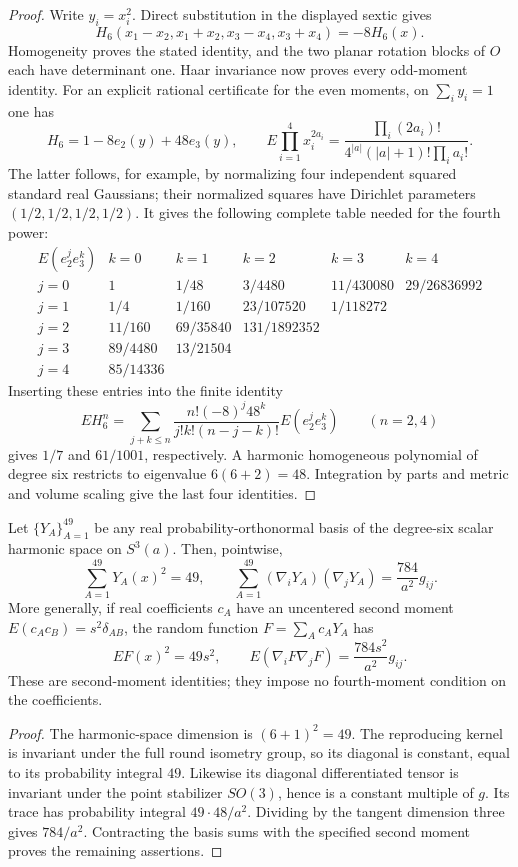 \documentclass[11pt]{article}
\begin{document}
\begin{proof}
Write \(y_i=x_i^2\). Direct substitution in the displayed sextic gives
\[
 H_6(x_1-x_2,x_1+x_2,x_3-x_4,x_3+x_4)=-8H_6(x).
\]
Homogeneity proves the stated identity, and the two planar rotation
blocks of \(O\) each have determinant one. Haar invariance now proves
every odd-moment identity. For an explicit rational certificate for the
even moments, on \(\sum_i y_i=1\) one has
\[
 H_6=1-8e_2(y)+48e_3(y),\qquad
 E\prod_{i=1}^4x_i^{2a_i}
 =\frac{\prod_i(2a_i)!}
 {4^{|a|}(|a|+1)!\prod_i a_i!}.
\]
The latter follows, for example, by normalizing four independent squared
standard real Gaussians; their normalized squares have Dirichlet
parameters \((1/2,1/2,1/2,1/2)\). It gives the following complete table
needed for the fourth power:
\[
\begin{array}{c|ccccc}
 E(e_2^j e_3^k)&k=0&k=1&k=2&k=3&k=4\\\hline
 j=0&1&1/48&3/4480&11/430080&29/26836992\\
 j=1&1/4&1/160&23/107520&1/118272&\\
 j=2&11/160&69/35840&131/1892352&&\\
 j=3&89/4480&13/21504&&&\\
 j=4&85/14336&&&&
\end{array}
\]
Inserting these entries into the finite identity
\[
 E H_6^n=
 \sum_{j+k\leq n}\frac{n!(-8)^j48^k}{j!k!(n-j-k)!}
                  E(e_2^j e_3^k)
 \qquad(n=2,4)
\]
gives \(1/7\) and \(61/1001\), respectively. A harmonic homogeneous
polynomial of degree six restricts to eigenvalue \(6(6+2)=48\).
Integration by parts and metric and volume scaling give the last four
identities.
\end{proof}

\begin{proposition}
\label{p1:prop:v215-degree-six-kernels}
Let \(\{Y_A\}_{A=1}^{49}\) be any real probability-orthonormal basis of
the degree-six scalar harmonic space on \(S^3(a)\). Then, pointwise,
\[
 \sum_{A=1}^{49}Y_A(x)^2=49,\qquad
 \sum_{A=1}^{49}(\nabla_iY_A)(\nabla_jY_A)
                 =\frac{784}{a^2}g_{ij}.
\]
More generally, if real coefficients \(c_A\) have an uncentered second
moment \(E(c_Ac_B)=s^2\delta_{AB}\), the random function
\(F=\sum_Ac_AY_A\) has
\[
 E F(x)^2=49s^2,\qquad
 E(\nabla_iF\nabla_jF)=\frac{784s^2}{a^2}g_{ij}.
\]
These are second-moment identities; they impose no fourth-moment
condition on the coefficients.
\end{proposition}
\begin{proof}
The harmonic-space dimension is \((6+1)^2=49\). The reproducing kernel
is invariant under the full round isometry group, so its diagonal is
constant, equal to its probability integral \(49\). Likewise its
diagonal differentiated tensor is invariant under the point stabilizer
\(SO(3)\), hence is a constant multiple of \(g\). Its trace has
probability integral \(49\cdot48/a^2\). Dividing by the tangent
dimension three gives \(784/a^2\). Contracting the basis sums with the
specified second moment proves the remaining assertions.
\end{proof}
\end{document}
